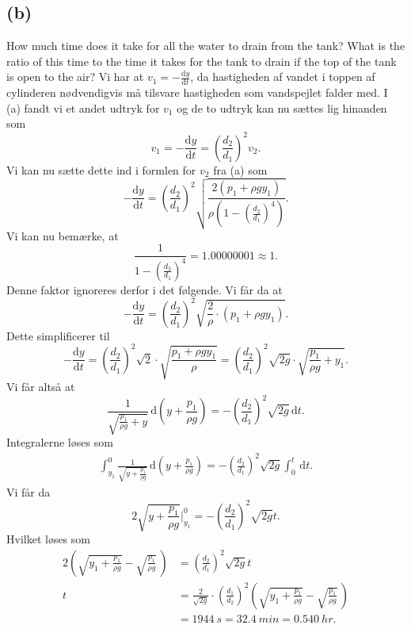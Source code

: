 \documentclass[12pt]{article}
\theoremstyle{definition}
\begin{document}
\subsection*{(b)}
How much time does it take for all the water to drain from the tank? What is the ratio of this time to the time it takes for the tank to drain if the top of the tank is open to the air?
\bigbreak
Vi har at $v_1 = - \frac{\mathrm{d}y}{\mathrm{d}t}$, da hastigheden af vandet i toppen af cylinderen nødvendigvis må tilsvare hastigheden som vandspejlet falder med. I (a) fandt vi et andet udtryk for $v_1$ og de to udtryk kan nu sættes lig hinanden som
\[ 
  v_1 = - \frac{\mathrm{d}y}{\mathrm{d}t} = \left( \frac{d_2}{d_1} \right)^2 v_2
.\]
Vi kan nu sætte dette ind i formlen for $v_2$ fra (a) som
\[ 
- \frac{\mathrm{d}y}{\mathrm{d}t} = \left( \frac{d_2}{d_1} \right)^2 \sqrt{\frac{2(p_1 + \rho g y_1)}{\rho \left( 1- \left( \frac{d_2}{d_1} \right)^{4} \right)}} 
.\]
Vi kan nu bemærke, at
\[ 
\frac{1}{1 - \left( \frac{d_2}{d_1} \right)^{4}} = \num{1,00000001} \approx 1 
.\]
Denne faktor ignoreres derfor i det følgende. Vi får da at
\[ 
- \frac{\mathrm{d}y}{\mathrm{d}t} = \left( \frac{d_2}{d_1} \right)^2 \sqrt{\frac{2}{\rho} \cdot (p_1 + \rho g y_1)}
.\]
Dette simplificerer til
\[ 
- \frac{\mathrm{d}y}{\mathrm{d}t} = \left( \frac{d_2}{d_1} \right)^2 \sqrt{2} \cdot \sqrt{ \frac{p_1 + \rho g y_1}{\rho}} = \left( \frac{d_2}{d_1} \right)^2 \sqrt{2g} \cdot \sqrt{\frac{p_1}{\rho g} + y_1}
.\]
Vi får altså at
\[ 
\frac{1}{\sqrt{\frac{p_1}{\rho g} + y}} \, \mathrm{d}\left( y + \frac{p_1}{\rho g} \right) = - \left( \frac{d_2}{d_1} \right)^2 \sqrt{2g} \, \mathrm{d}t 
.\]
Integralerne løses som
\begin{align*}
  \int_{y_1}^{0} \frac{1}{\sqrt{y + \frac{p_1}{\rho g}}} \, \mathrm{d} \left( y + \frac{p_1}{\rho g} \right) = - \left( \frac{d_2}{d_1} \right)^2 \sqrt{2g} \int_{0}^{t} \, \mathrm{d}t
.\end{align*}
Vi får da
\[ 
2 \sqrt{y + \frac{p_1}{\rho g}}  \bigg|_{y_1}^0 = - \left( \frac{d_2}{d_1} \right)^2 \sqrt{2g} t
.\]
Hvilket løses som
\begin{align*}
  2 \left( \sqrt{y_1 + \frac{p_1}{\rho g}} - \sqrt{\frac{p_1}{\rho g}} \, \right) &= \left( \frac{d_2}{d_1} \right)^2 \sqrt{2g}t \\
  t &= \frac{2}{\sqrt{2g}} \cdot \left( \frac{d_1}{d_2} \right)^2 \left( \sqrt{y_1 + \frac{p_1}{\rho g}} - \sqrt{\frac{p_1}{\rho g}} \, \right) \\
    &= \qty{1944}{s} = \qty{32,4}{min} = \qty{0,540}{hr} 
.\end{align*}
\end{document}
